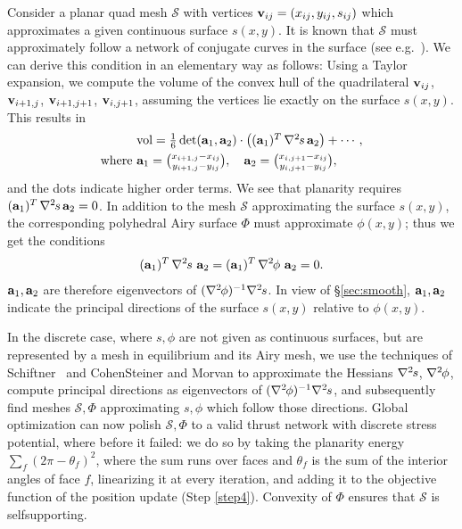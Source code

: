 \documentclass[annual]{acmsiggraph}
\def\ess{s}
\def\Hess#1{{\def\testess{#1}\nabla^2\ifx\testess\ess\!s\else #1\fi}}
\def\Hess#1{\text{$\nabla^2\hskip-.2ex #1$}}
\def\SS{{\mathcal S}}
\begin{document}
Consider a planar quad mesh $\SS$ with vertices
${\mathbf v}_{ij}=(x_{ij},y_{ij},s_{ij})$ which approximates a given continuous
surface $s(x,y)$. It is known that $\SS$ must approximately follow a network
of conjugate curves in the surface (see e.g.\ \cite{Liu2006}). We can derive
this condition in an elementary way as follows: Using a Taylor expansion, we
compute the volume of the convex hull of the quadrilateral ${\mathbf v}_{ij}$,
${\mathbf v}_{i+1,j}$, ${\mathbf v}_{i+1,j+1}$, ${\mathbf v}_{i,j+1}$, assuming the vertices lie
exactly on the surface $s(x,y)$. This results in
	\begin{align*}
	&\textstyle
	\text{vol} =
	{1\over 6}\det(\aw_1,\aw_2) \cdot
		\left((\aw_1)^T\,\Hess s\,\aw_2 \right)+ \cdots,
	\\
	\text{where}\
	& \textstyle
	\aw_1={x_{i+1,j}-x_{ij}\choose y_{i+1,j}-y_{ij}},\quad
	\aw_2={x_{i,j+1}-x_{ij}\choose y_{i,j+1}-y_{ij}},
	\end{align*}
 and the dots indicate higher order terms. We see that planarity requires
$(\aw_1)^T\,\Hess s\,\aw_2=0$. In addition to the mesh $\SS$ approximating
the surface $s(x,y)$, the corresponding polyhedral Airy surface $\Phi$
must approximate $\phi(x,y)$; thus we get the conditions
	\begin{align*}
	(\aw_1)^T\,\Hess s\,\,\aw_2=
	(\aw_1)^T\,\Hess \phi\,\,\aw_2= 0.
	\end{align*}
 ${\mathbf a}_1,{\mathbf a}_2$ are therefore eigenvectors of $(\Hess\phi)^{-1}\Hess s$. In
view of \S\ref{sec:smooth}, ${\mathbf a}_1,{\mathbf a}_2$ indicate the principal
directions of the surface $s(x,y)$ relative to $\phi(x,y)$.



In the discrete case, where $s,\phi$ are not given as continuous surfaces,
but are represented by a mesh in equilibrium and its Airy mesh, we use the
techniques of Schiftner~\shortcite{Schiftner2007} and Cohen\dash Steiner
and Morvan \shortcite{Cohen-Steiner2003} to approximate the Hessians
$\Hess s$, $\Hess\phi$, compute principal directions as eigenvectors of
$(\Hess\phi)^{-1}\Hess s$, and subsequently find meshes $\SS,\Phi$
approximating $s,\phi$ which follow those directions. Global optimization
can now polish $\SS,\Phi$ to a valid thrust network with discrete stress
potential, where before it failed: we do so by taking the planarity energy
$\sum_f (2\pi - \theta_f)^2$, where the sum runs over faces and $\theta_f$ is the
sum of the interior angles of face $f$, linearizing it at every iteration, and
adding it to the objective function of the position update (Step \ref{step4}).
Convexity of $\Phi$ ensures that $\SS$ is self\dash supporting.
\end{document}

